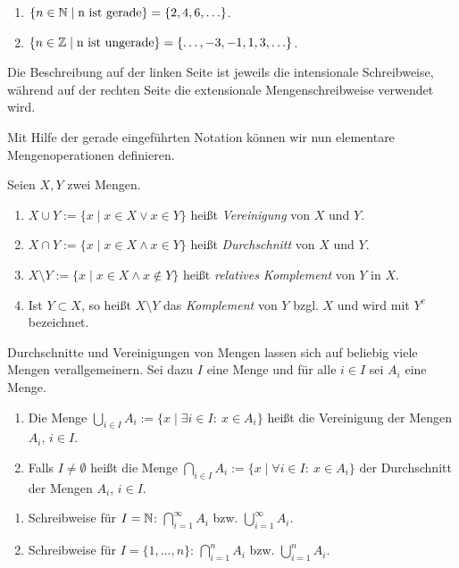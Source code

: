 \begin{frame}
\begin{example}
\begin{enumerate}
\item $\{n \in \mathbb{N} \mid \text{n ist gerade} \} = \{2,4,6,\ldots\}$.
\item $\{n \in \mathbb{Z} \mid \text{n ist ungerade} \} = \{\ldots,-3,-1,1,3,\ldots\}$.
\end{enumerate}

Die Beschreibung auf der linken Seite ist jeweils die intensionale Schreibweise,
während auf der rechten Seite die extensionale Mengenschreibweise verwendet wird.
\end{example}
\end{frame}


\begin{frame}
Mit Hilfe der gerade eingeführten Notation können wir nun elementare
Mengenoperationen definieren.

\begin{mydef}
Seien $X,Y$ zwei Mengen.
\begin{enumerate}
\item $X \cup Y := \{x \mid x \in X \vee x \in Y \}$
heißt \textit{Vereinigung} von $X$ und $Y$.

\item $X \cap Y := \{x \mid x \in X \wedge x \in Y \}$
heißt \textit{Durchschnitt} von $X$ und $Y$.

\item $X \setminus Y := \{x \mid x \in X \wedge x \notin Y \}$
heißt \textit{relatives Komplement} von $Y$ in $X$.

\item Ist $Y \subset X$, so heißt $X \setminus Y$
das \textit{Komplement} von $Y$ bzgl. $X$ und wird mit $Y^c$ bezeichnet.
\end{enumerate}
\end{mydef}
\end{frame}


\begin{frame}
\begin{mydef}
Durchschnitte und Vereinigungen von Mengen lassen sich auf beliebig viele
Mengen verallgemeinern.
Sei dazu $I$ eine Menge und für alle $i \in I$ sei $A_i$ eine Menge.

\begin{enumerate}
\item Die Menge
$\bigcup_{i \in I} A_i := \{x \mid \exists i \in I\!:\ x \in A_i \}$
heißt die Vereinigung der Mengen $A_i$, $i \in I$.

\item Falls $I \neq \emptyset$ heißt die Menge
$\bigcap_{i \in I} A_i := \{x \mid \forall i \in I\!:\ x \in A_i \}$
der Durchschnitt der Mengen $A_i$, $i \in I$.
\end{enumerate}
\end{mydef}
\end{frame}


\begin{frame}
\begin{remark}
\begin{enumerate}
\item Schreibweise für $I = \mathbb{N}$: $\bigcap_{i=1}^{\infty}A_i$ bzw.
$\bigcup_{i=1}^{\infty}A_i$.

\item Schreibweise für $I = \{1,...,n\}$: $\bigcap_{i=1}^n A_i$ bzw.
$\bigcup_{i=1}^n A_i$.
\end{enumerate}
\end{remark}
\end{frame}
